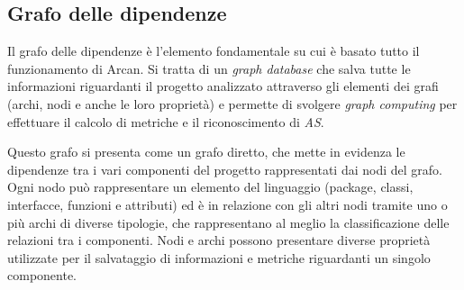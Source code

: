     \subsection{Grafo delle dipendenze}
        Il grafo delle dipendenze è l'elemento fondamentale su cui è basato tutto il funzionamento di Arcan. Si tratta di un \textit{graph database} che salva tutte le informazioni riguardanti il progetto analizzato attraverso gli elementi dei grafi (archi, nodi e anche le loro proprietà) e permette di svolgere \textit{graph computing} per effettuare il calcolo di metriche e il riconoscimento di \textit{AS}.
    
        Questo grafo si presenta come un grafo diretto, che mette in evidenza le dipendenze tra i vari componenti del progetto rappresentati dai nodi del grafo. Ogni nodo può rappresentare un elemento del linguaggio (package, classi, interfacce, funzioni e attributi) ed è in relazione con gli altri nodi tramite uno o più archi di diverse tipologie, che rappresentano al meglio la classificazione delle relazioni tra i componenti.  Nodi e archi possono presentare diverse proprietà utilizzate per il salvataggio di informazioni e metriche riguardanti un singolo componente.
            
